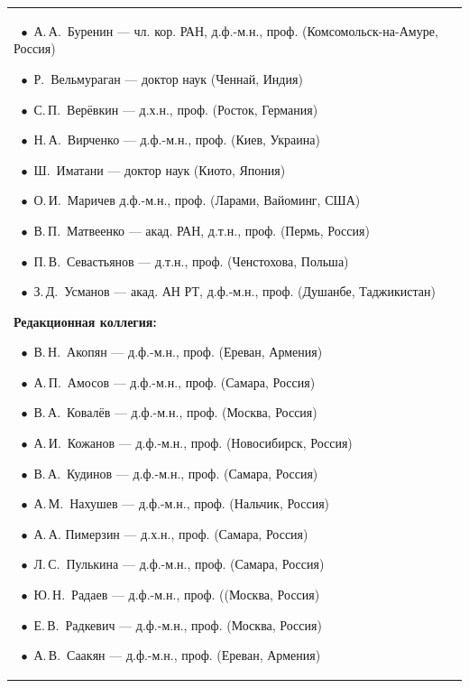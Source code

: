 \begin{table}[t!]
\begin{tabular}{p{7cm}p{6cm}}
{$~~\bullet$ А.\,А.~Буренин --- чл. кор. РАН, д.ф.-м.н., проф. (Комсомольск-на-Амуре, Россия)\par
$~~\bullet$ Р.~Вельмураган  --- доктор наук (Ченнай, Индия) \par
$~~\bullet$ С.\,П.~Верёвкин  --- д.х.н., проф. (Росток, Германия) \par
$~~\bullet$ Н.\,А.~Вирченко --- д.ф.-м.н., проф. (Киев, Украина) \par
$~~\bullet$ Ш.~Иматани --- доктор наук (Киото, Япония) \par
$~~\bullet$ О.\,И.~Маричев  д.ф.-м.н., проф. (Ларами, Вайоминг, США) \par
$~~\bullet$ В.\,П.~Матвеенко --- акад. РАН, д.т.н., проф. (Пермь, Россия) \par
$~~\bullet$ П.\,В.~Севастьянов  --- д.т.н., проф. (Ченстохова, Польша) \par
$~~\bullet$ З.\,Д.~Усманов  --- акад. АН РТ, д.ф.-м.н., проф. (Душанбе, Таджикистан) \par
\smallskip \par
\textbf{Редакционная коллегия:}\par 
$~~\bullet$ В.\,Н.~Акопян --- д.ф.-м.н., проф. (Ереван, Армения) \par
$~~\bullet$ А.\,П.~Амосов --- д.ф.-м.н., проф. (Самара, Россия) \par 
$~~\bullet$ В.\,А.~Ковалёв --- д.ф.-м.н., проф. (Москва, Россия) \par
$~~\bullet$ А.\,И.~Кожанов --- д.ф.-м.н., проф. (Новосибирск, Россия) \par 
$~~\bullet$ В.\,А.~Кудинов --- д.ф.-м.н., проф. (Самара, Россия) \par 
$~~\bullet$ А.\,М.~Нахушев --- д.ф.-м.н., проф. (Нальчик, Россия) \par
$~~\bullet$ А.\,А. Пимерзин  --- д.х.н., проф. (Самара, Россия) \par
$~~\bullet$ Л.\,С.~Пулькина --- д.ф.-м.н., проф. (Самара, Россия) \par 
$~~\bullet$ Ю.\,Н.~Радаев --- д.ф.-м.н., проф. ((Москва, Россия) \par 
$~~\bullet$ Е.\,В.~Радкевич --- д.ф.-м.н., проф. (Москва, Россия) \par
$~~\bullet$  А.\,В.~Саакян --- д.ф.-м.н., проф. (Ереван, Армения) \par
}
\end{tabular}
\end{table}
